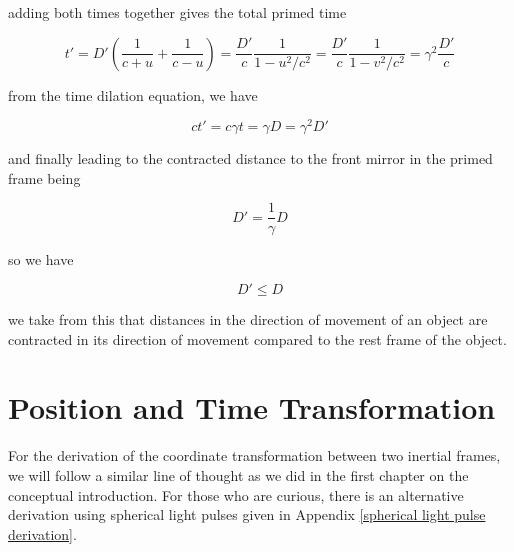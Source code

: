 adding both times together gives the total primed time

\begin{equation}
	t{'} = D{'}(\frac{1}{c+u} + \frac{1}{c-u})=\frac{D'}{c}\frac{1}{1-u^2/c^2} =\frac{D'}{c}\frac{1}{1-v^2/c^2}={\gamma}^2 \frac{D'}{c}
\end{equation}

from the time dilation equation, we have

\begin{equation}
	ct{'}=c{\gamma} t = {\gamma} D = {\gamma}^2 D{'}
\end{equation}

and finally leading to the contracted distance to the front mirror in the primed frame being

\begin{equation}
	D{'} = \frac{1}{{\gamma}}D
\end{equation}

so we have

\begin{equation}
	D{'} \leq D
\end{equation}

we take from this that distances in the direction of movement of an object are contracted in its direction of movement compared to the rest frame of the object.

\section{Position and Time Transformation}

For the derivation of the coordinate transformation between two inertial frames, we will follow a similar line of thought as we did in the first chapter on the conceptual introduction.
For those who are curious, there is an alternative derivation using spherical light pulses given in Appendix \ref{spherical light pulse derivation}.

